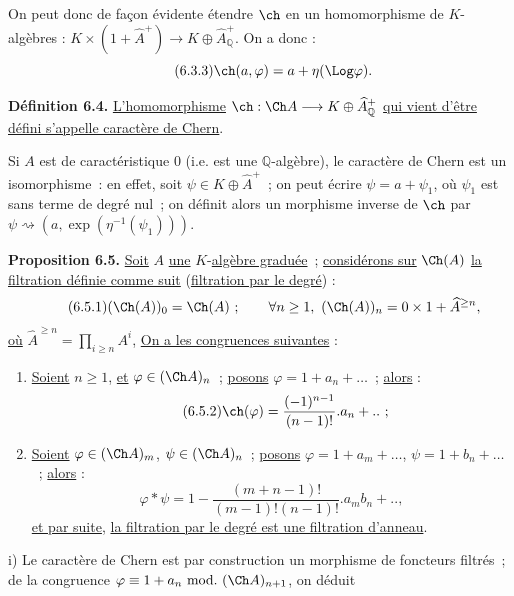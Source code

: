

On
peut donc de façon évidente étendre \(\ch\) en un homomorphisme de \(K\)-algèbres : \(K\times(1+\widehat A^+)\longrightarrow K\oplus\widehat A_{\mathbb Q}^{+}\). On a donc :
\begin{equation}\tag{6.3.3}
  \ch(a,\varphi)=a+\eta(\Log\varphi).
\end{equation}

\textbf{Définition 6.4.} \uline{L'homomorphisme} \(\ch:\Ch A\longrightarrow K\oplus\widehat A_{\mathbb Q}^{+}\) \uline{qui vient d'être} \uline{défini s'appelle caractère de Chern}.

Si \(A\) est de caractéristique \(0\) (i.e. est une \(\mathbb Q\)-algèbre), le caractère de Chern est un isomorphisme~: en effet, soit \(\psi\in K\oplus\widehat A^+\)~; on peut écrire \(\psi=a+\psi_1\), où \(\psi_1\) est sans terme de degré nul~; on définit alors un morphisme inverse de \(\ch\) par \(\psi\rightsquigarrow(a,\exp(\eta^{-1}(\psi_1)))\).

\textbf{Proposition 6.5.} \uline{Soit} \(A\) \uline{une} \(K\)-\uline{algèbre graduée}~; \uline{considérons sur} \(\Ch(A)\) \uline{la filtration définie comme suit} (\uline{filtration par le degré}) :
\begin{equation}\tag{6.5.1}
  (\Ch(A))_0=\Ch(A)~;\qquad
  \forall n\ge1,\ (\Ch(A))_n=0\times 1+\widehat A^{\ge n},
\end{equation}
\uline{où} \(\widehat A^{\ge n}=\prod_{i\ge n}A^i\), \uline{On a les congruences suivantes} :

\begin{enumerate}[label=\roman*)]
\item \uline{Soient} \(n\ge1\), \uline{et} \(\varphi\in(\Ch A)_n\)~; \uline{posons} \(\varphi=1+a_n+\ldots\)~; \uline{alors} :
\begin{equation}\tag{6.5.2}
  \ch(\varphi)=\frac{(-1)^{n-1}}{(n-1)!}.a_n+..~;
\end{equation}

\item \uline{Soient} \(\varphi\in(\Ch A)_m\), \(\psi\in(\Ch A)_n\)~; \uline{posons}
\(\varphi=1+a_m+\ldots\), \(\psi=1+b_n+\ldots\)~; \uline{alors} :
\begin{equation}\tag{6.5.3}
  \varphi*\psi
  =
  1-\frac{(m+n-1)!}{(m-1)!(n-1)!}.a_m b_n+..,
\end{equation}
\uline{et par suite}, \uline{la filtration par le degré est une filtration d'anneau}.
\end{enumerate}

i) Le caractère de Chern est par construction un morphisme de foncteurs filtrés~; de la congruence \(\varphi\equiv1+a_n\ \mathrm{mod.}\ (\Ch A)_{n+1}\), on déduit
